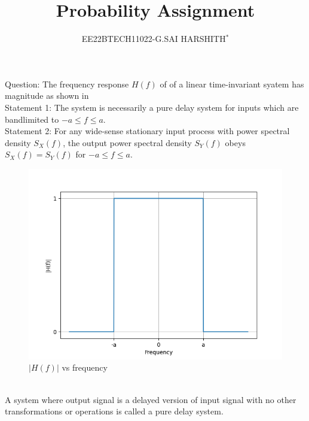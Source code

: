 \documentclass[journal,12pt,twocolumn]{IEEEtran}
\theoremstyle{remark}
\begin{document}

\vspace{3cm}

\title{Probability Assignment}
\author{EE22BTECH11022-G.SAI HARSHITH$^{*}$%
}
\maketitle
\newpage
\bigskip
\renewcommand{\thefigure}{\theenumi}
\renewcommand{\thetable}{\theenumi}

Question: The frequency response $H(f)$ of of a linear time-invariant syatem has magnitude as shown in \\
Statement 1: The system is necessarily a pure delay system for inputs which are bandlimited to $-a \leq f \leq a$.\\
Statement 2: For any wide-sense stationary input process with power spectral density $S_X(f)$, the output power spectral density $S_Y(f)$ obeys $S_X(f)=S_Y(f)$ for $-a \leq f \leq a$.\\
\begin{figure}[!ht]
\centering
\includegraphics[width=\columnwidth]{figs/figure.png}
\caption{$|H(f)|$ vs frequency}
\label{fig:11}
\end{figure}\\
\fi
\solution A system where output signal is a delayed version of input signal with no other transformations or operations is called a pure delay system.
\end{document}
